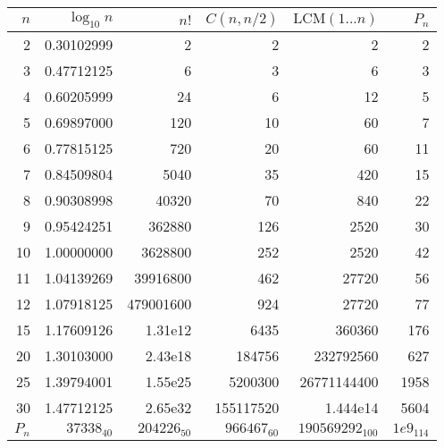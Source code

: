 \begin{center}
    \begin{tabular}{|r|r|r|r|r|r|}
        \hline
        \rowcolor{gray!20}
        $n$         & $\log_{10}n$  & $n!$          & $C(n,n/2)$    & $\mathrm{LCM}(1...n)$ & $P_n$         \\ \hline
        2           & 0.30102999    & 2             & 2             & 2                     & 2             \\ \hline
        3           & 0.47712125    & 6             & 3             & 6                     & 3             \\ \hline
        4           & 0.60205999    & 24            & 6             & 12                    & 5             \\ \hline
        5           & 0.69897000    & 120           & 10            & 60                    & 7             \\ \hline
        6           & 0.77815125    & 720           & 20            & 60                    & 11            \\ \hline
        7           & 0.84509804    & 5040          & 35            & 420                   & 15            \\ \hline
        8           & 0.90308998    & 40320         & 70            & 840                   & 22            \\ \hline
        9           & 0.95424251    & 362880        & 126           & 2520                  & 30            \\ \hline
        10          & 1.00000000    & 3628800       & 252           & 2520                  & 42            \\ \hline
        11          & 1.04139269    & 39916800      & 462           & 27720                 & 56            \\ \hline
        12          & 1.07918125    & 479001600     & 924           & 27720                 & 77            \\ \hline
        15          & 1.17609126    & 1.31e12       & 6435          & 360360                & 176           \\ \hline
        20          & 1.30103000    & 2.43e18       & 184756        & 232792560             & 627           \\ \hline
        25          & 1.39794001    & 1.55e25       & 5200300       & 26771144400           & 1958          \\ \hline
        30          & 1.47712125    & 2.65e32       & 155117520     & 1.444e14              & 5604          \\ \hline
        $P_n$       & $37338_{40}$  & $204226_{50}$ & $966467_{60}$ & $190569292_{100}$     & $1e9_{114}$   \\ \hline
    \end{tabular}\\
\end{center}
